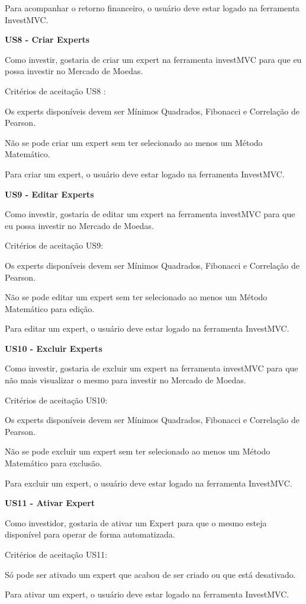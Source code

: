 Para acompanhar o retorno financeiro, o usuário deve estar logado na ferramenta InvestMVC.

\textbf{US8 - Criar Experts}

Como investir, gostaria de criar um expert na ferramenta investMVC para que eu possa investir no Mercado de Moedas.

Critérios de aceitação US8 :

Os experts disponíveis devem ser Mínimos Quadrados, Fibonacci e Correlação de Pearson.

Não se pode criar um expert sem ter selecionado ao menos um Método Matemático.

Para criar um expert, o usuário deve estar logado na ferramenta InvestMVC.

\textbf{US9 - Editar Experts}

Como investir, gostaria de editar um expert na ferramenta investMVC para que eu possa investir no Mercado de Moedas.

Critérios de aceitação US9: 

Os experts disponíveis devem ser Mínimos Quadrados, Fibonacci e Correlação de Pearson.

Não se pode editar um expert sem ter selecionado ao menos um Método Matemático para edição.

Para editar um expert, o usuário deve estar logado na ferramenta InvestMVC.


\textbf{US10 - Excluir Experts}

Como investir, gostaria de excluir um expert na ferramenta investMVC para que não mais visualizar o mesmo para investir no Mercado de Moedas.

Critérios de aceitação US10:

Os experts disponíveis devem ser Mínimos Quadrados, Fibonacci e Correlação de Pearson.

Não se pode excluir um expert sem ter selecionado ao menos um Método Matemático para exclusão.

Para excluir um expert, o usuário deve estar logado na ferramenta InvestMVC.


\textbf{US11 - Ativar Expert}

Como investidor, gostaria de ativar um Expert para que o mesmo esteja disponível para operar de forma automatizada.

Critérios de aceitação US11:

Só pode ser ativado um expert que acabou de ser criado ou que está desativado.

Para ativar um expert, o usuário deve estar logado na ferramenta InvestMVC.

